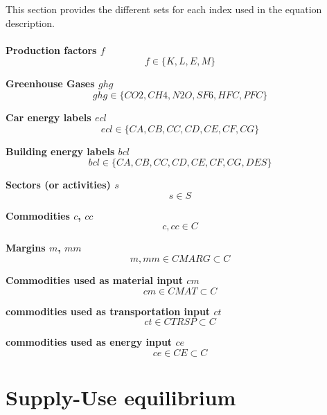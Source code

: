 \documentclass[12pt]{article}
\numberwithin{equation}{section}
\begin{document}
This section provides the different sets for each index used in the equation description. \\ \\
\noindent \textbf{Production factors $f$} 
\begin{equation} f \in  \{ K,L,E,M \} \end{equation}

\noindent \textbf{Greenhouse Gases $ghg$} 
\begin{equation} ghg \in  \{ CO2, CH4, N2O, SF6, HFC, PFC\} \end{equation}

\noindent \textbf{Car energy labels $ecl$} 
\begin{equation} ecl \in  \{CA, CB, CC, CD, CE, CF, CG\} \end{equation}

\noindent \textbf{Building energy labels $bcl$} 
\begin{equation} bcl \in  \{CA, CB, CC, CD, CE, CF, CG, DES\} \end{equation}

\noindent \textbf{Sectors (or activities) $s$} 
\begin{equation} s \in S \end{equation}

\noindent \textbf{Commodities $c$, $cc$} 
\begin{equation} c, cc \in C \end{equation}

\noindent \textbf{Margins $m$, $mm$} 
\begin{equation} m, mm \in  CMARG \subset C \end{equation}

\noindent \textbf{Commodities used as material input $cm$} 
\begin{equation} cm \in  CMAT \subset C \end{equation}

\noindent \textbf{commodities used as transportation input $ct$} 
\begin{equation} ct \in  CTRSP \subset C \end{equation}

\noindent \textbf{commodities used as energy input $ce$} 
\begin{equation} ce \in  CE \subset C \end{equation}


\section{Supply-Use equilibrium}
\end{document}
